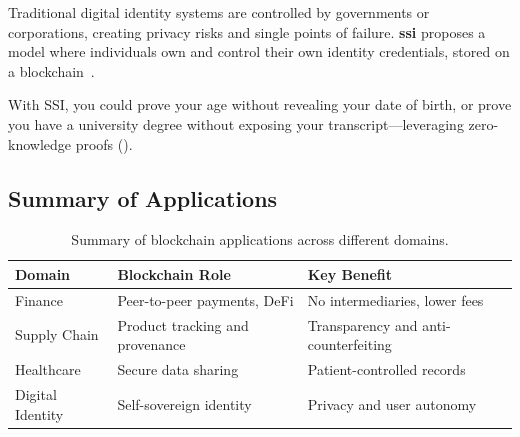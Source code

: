 Traditional digital identity systems are controlled by governments or corporations, creating privacy risks and single points of failure. \textbf{\Gls{ssi}} proposes a model where individuals own and control their own identity credentials, stored on a blockchain~\cite{allen2016ssi}.

With SSI, you could prove your age without revealing your date of birth, or prove you have a university degree without exposing your transcript---leveraging zero-knowledge proofs ().


\subsection{Summary of Applications}

\begin{table}[htbp]
\centering
\begin{tabularx}{\textwidth}{l X X}
\toprule
\textbf{Domain} & \textbf{Blockchain Role} & \textbf{Key Benefit} \\
\midrule
Finance          & Peer-to-peer payments, DeFi     & No intermediaries, lower fees \\
Supply Chain     & Product tracking and provenance  & Transparency and anti-counterfeiting \\
Healthcare       & Secure data sharing              & Patient-controlled records \\
Digital Identity & Self-sovereign identity          & Privacy and user autonomy \\
\bottomrule
\end{tabularx}
\caption{Summary of blockchain applications across different domains.}
\label{tab:applications}
\end{table}
